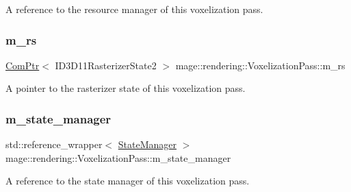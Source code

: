 A reference to the resource manager of this voxelization pass. \hypertarget{classmage_1_1rendering_1_1_voxelization_pass_a0b92de6ef466e697204af0bc5907fcc8}{}\label{classmage_1_1rendering_1_1_voxelization_pass_a0b92de6ef466e697204af0bc5907fcc8} 
\subsubsection{\texorpdfstring{m\+\_\+rs}{m\_rs}}
{\footnotesize\ttfamily \hyperlink{namespacemage_ae74f374780900893caa5555d1031fd79}{Com\+Ptr}$<$ I\+D3\+D11\+Rasterizer\+State2 $>$ mage\+::rendering\+::\+Voxelization\+Pass\+::m\+\_\+rs\hspace{0.3cm}{\ttfamily [private]}}

A pointer to the rasterizer state of this voxelization pass. \hypertarget{classmage_1_1rendering_1_1_voxelization_pass_a449470bf0e0a246a2457b87289155330}{}\label{classmage_1_1rendering_1_1_voxelization_pass_a449470bf0e0a246a2457b87289155330} 
\subsubsection{\texorpdfstring{m\+\_\+state\+\_\+manager}{m\_state\_manager}}
{\footnotesize\ttfamily std\+::reference\+\_\+wrapper$<$ \hyperlink{classmage_1_1rendering_1_1_state_manager}{State\+Manager} $>$ mage\+::rendering\+::\+Voxelization\+Pass\+::m\+\_\+state\+\_\+manager\hspace{0.3cm}{\ttfamily [private]}}

A reference to the state manager of this voxelization pass. \hypertarget{classmage_1_1rendering_1_1_voxelization_pass_a5263939327363598c9d628db79b3cc49}{}\label{classmage_1_1rendering_1_1_voxelization_pass_a5263939327363598c9d628db79b3cc49} 
